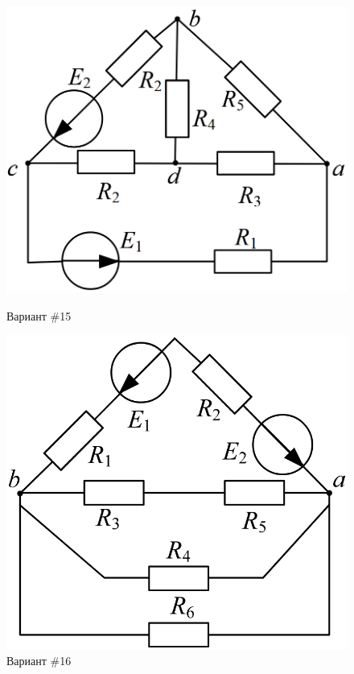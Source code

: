 \begin{figure}[H]
    \centering
    \begin{minipage}{0.48\textwidth}
        \centering
        \includegraphics[width=\textwidth]{images/15_task.png}
        \caption{Вариант \#15}
        \label{fig:task_15}
    \end{minipage}
    \hfill
    \begin{minipage}{0.48\textwidth}
        \centering
        \includegraphics[width=\textwidth]{images/16_task.png}
        \caption{Вариант \#16}
        \label{fig:task_16}
    \end{minipage}
\end{figure}

